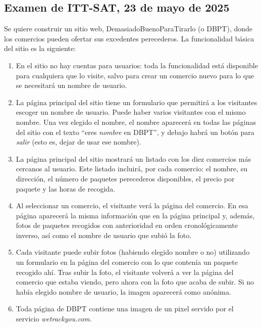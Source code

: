 
\subsection{Examen de ITT-SAT, 23 de mayo de 2025}

Se quiere construir un sitio web, DemasiadoBuenoParaTirarlo (o DBPT), donde los comercios pueden ofertar sus excedentes perecederos. La funcionalidad básica del sitio es la siguiente:

\begin{enumerate}
  \item En el sitio no hay cuentas para usuarios: toda la funcionalidad está disponible para cualquiera que lo visite, salvo para crear un comercio nuevo para lo que se necesitará un nombre de usuario.
  \item La página principal del sitio tiene un formulario que permitirá a los visitantes escoger un nombre de usuario. Puede haber varios visitantes con el mismo nombre. Una vez elegido el nombre, el nombre aparecerá en todas las páginas del sitio con el texto ``eres \emph{nombre} en DBPT'', y debajo habrá un botón para \emph{salir} (esto es, dejar de usar ese nombre).
  \item La página principal del sitio mostrará un listado con los diez comercios más cercanos al usuario. Este listado incluirá, por cada comercio: el nombre, su dirección, el número de paquetes perecederos disponibles, el precio por paquete y las horas de recogida.
  \item Al seleccionar un comercio, el visitante verá la página del comercio. En esa página aparecerá la misma información que en la página principal y, además, fotos de paquetes recogidos con anterioridad en orden cronológicamente inverso, así como el nombre de usuario que subió la foto.
  \item Cada visitante puede subir fotos (habiendo elegido nombre o no) utilizando un formulario en la página del comercio con lo que contenía un paquete recogido ahí. Tras subir la foto, el visitante volverá a ver la página del comercio que estaba viendo, pero ahora con la foto que acaba de subir. Si no había elegido nombre de usuario, la imagen aparecerá como anónima.
  \item Toda página de DBPT contiene una imagen de un pixel servido por el servicio \emph{wetrackyou.com}.
\end{enumerate}

